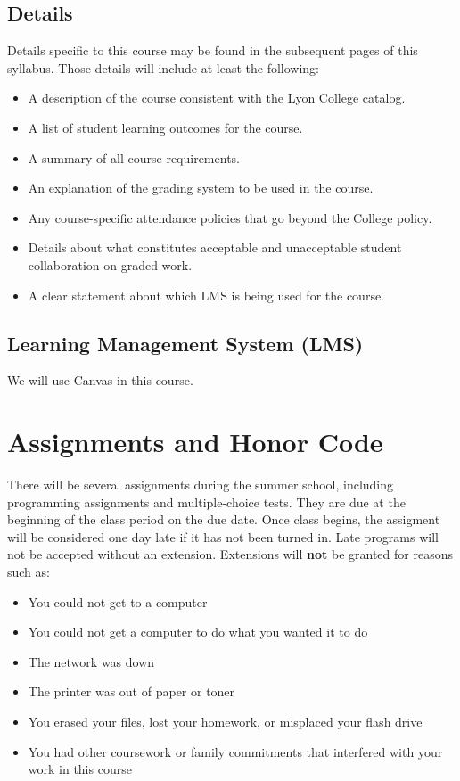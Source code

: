 \documentclass[11pt]{article}
\begin{document}
\subsection{Details}
\label{sec:org2dafc45}

Details specific to this course may be found in the subsequent pages
of this syllabus. Those details will include at least the following:
\begin{itemize}
\item A description of the course consistent with the Lyon College
catalog.
\item A list of student learning outcomes for the course.
\item A summary of all course requirements.
\item An explanation of the grading system to be used in the course.
\item Any course-specific attendance policies that go beyond the College
policy.
\item Details about what constitutes acceptable and unacceptable student
collaboration on graded work.
\item A clear statement about which LMS is being used for the course.
\end{itemize}

\subsection{Learning Management System (LMS)}
\label{sec:org5e2b12e}

We will use Canvas in this course.
\section{Assignments and Honor Code}
\label{sec:orgc8b7c31}

There will be several assignments during the summer school,
including programming assignments and multiple-choice tests. They
are due at the beginning of the class period on the due date. Once
class begins, the assigment will be considered one day late if it
has not been turned in.  Late programs will not be accepted without
an extension. Extensions will \textbf{not} be granted for reasons such as:

\begin{itemize}
\item You could not get to a computer
\item You could not get a computer to do what you wanted it to do
\item The network was down
\item The printer was out of paper or toner
\item You erased your files, lost your homework, or misplaced your
flash drive
\item You had other coursework or family commitments that interfered
with your work in this course
\end{itemize}
\end{document}
